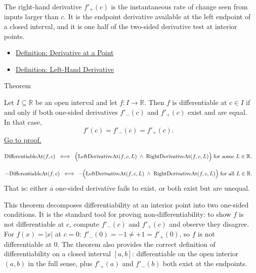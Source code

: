 \begin{remark*}[Interpretation]
The right-hand derivative $f'_+(c)$ is the instantaneous rate of change
seen from inputs larger than $c$. It is the endpoint derivative available
at the left endpoint of a closed interval, and it is one half of the
two-sided derivative test at interior points.
\end{remark*}

\begin{dependencies}
\begin{itemize}
  \item \hyperref[def:derivative-at-a-point]{Definition: Derivative at a Point}
  \item \hyperref[def:left-hand-derivative]{Definition: Left-Hand Derivative}
\end{itemize}
\end{dependencies}


\begin{theorembox}{Theorem}
\begin{theorem}
\label{thm:differentiability-and-one-sided-derivatives}
Let $I \subseteq \mathbb{R}$ be an open interval and let $f : I \to \mathbb{R}$. Then $f$ is differentiable at $c \in I$ if and only if both one-sided derivatives $f'_-(c)$ and $f'_+(c)$ exist and are equal. In that case,
\[
f'(c) = f'_-(c) = f'_+(c).
\]
\hyperref[prf:differentiability-and-one-sided-derivatives]{Go to proof.}
\end{theorem}
\end{theorembox}

\begin{remark*}
\[
\operatorname{DifferentiableAt}(f, c)
\;\iff\;
\Bigl(\operatorname{LeftDerivativeAt}(f,c,L) \;\land\; \operatorname{RightDerivativeAt}(f,c,L)\Bigr)
\;\text{for some } L \in \mathbb{R}.
\]
\end{remark*}

\begin{remark*}
\[
\lnot\operatorname{DifferentiableAt}(f,c)
\;\iff\;
\lnot\Bigl(\operatorname{LeftDerivativeAt}(f,c,L) \;\land\; \operatorname{RightDerivativeAt}(f,c,L)\Bigr)
\;\text{for all } L \in \mathbb{R}.
\]
That is: either a one-sided derivative fails to exist, or both exist but are unequal.
\end{remark*}

\begin{remark*}[Interpretation]
This theorem decomposes differentiability at an interior point into two one-sided conditions. It is the standard tool for proving non-differentiability: to show $f$ is not differentiable at $c$, compute $f'_-(c)$ and $f'_+(c)$ and observe they disagree. For $f(x) = |x|$ at $c = 0$: $f'_-(0) = -1 \neq +1 = f'_+(0)$, so $f$ is not differentiable at $0$. The theorem also provides the correct definition of differentiability on a closed interval $[a,b]$: differentiable on the open interior $(a,b)$ in the full sense, plus $f'_+(a)$ and $f'_-(b)$ both exist at the endpoints.
\end{remark*}

